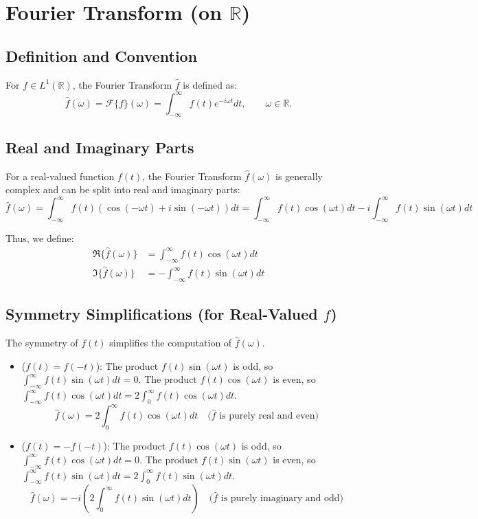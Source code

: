 \documentclass[12pt]{article}
\begin{document}
\section*{Fourier Transform (on $\mathbb{R}$)}

\subsection*{Definition and Convention}
For $f \in L^1(\mathbb{R})$, the Fourier Transform $\hat{f}$ is defined as:
\[
\hat{f}(\omega) = \mathcal{F}\{f\}(\omega) = \int_{-\infty}^{\infty} f(t) e^{-i\omega t} dt, \qquad \omega \in \mathbb{R}.
\]

\subsection*{Real and Imaginary Parts}
For a real-valued function $f(t)$, the Fourier Transform $\hat{f}(\omega)$ is generally complex and can be split into real and imaginary parts:
\[
\hat{f}(\omega) = \int_{-\infty}^{\infty} f(t) (\cos(-\omega t) + i \sin(-\omega t)) dt = \int_{-\infty}^{\infty} f(t) \cos(\omega t) dt - i \int_{-\infty}^{\infty} f(t) \sin(\omega t) dt
\]

\noindent
Thus, we define:
\begin{align*}
\Re\{\hat{f}(\omega)\} &= \int_{-\infty}^{\infty} f(t) \cos(\omega t) dt \\
\Im\{\hat{f}(\omega)\} &= -\int_{-\infty}^{\infty} f(t) \sin(\omega t) dt
\end{align*}

\subsection*{Symmetry Simplifications (for Real-Valued $f$)}
The symmetry of $f(t)$ simplifies the computation of $\hat{f}(\omega)$.

\begin{itemize}[leftmargin=*, label={$\bullet$}]
    \item ($f(t) = f(-t)$):
    The product $f(t)\sin(\omega t)$ is odd, so $\int_{-\infty}^{\infty} f(t) \sin(\omega t) dt = 0$.
    The product $f(t)\cos(\omega t)$ is even, so $\int_{-\infty}^{\infty} f(t) \cos(\omega t) dt = 2 \int_{0}^{\infty} f(t) \cos(\omega t) dt$.
    \[
    \hat{f}(\omega) = 2 \int_{0}^{\infty} f(t) \cos(\omega t) dt \quad \text{($\hat{f}$ is purely real and even)}
    \]

    \item ($f(t) = -f(-t)$):
    The product $f(t)\cos(\omega t)$ is odd, so $\int_{-\infty}^{\infty} f(t) \cos(\omega t) dt = 0$.
    The product $f(t)\sin(\omega t)$ is even, so $\int_{-\infty}^{\infty} f(t) \sin(\omega t) dt = 2 \int_{0}^{\infty} f(t) \sin(\omega t) dt$.
    \[
    \hat{f}(\omega) = -i \left( 2 \int_{0}^{\infty} f(t) \sin(\omega t) dt \right) \quad \text{($\hat{f}$ is purely imaginary and odd)}
    \]
\end{itemize}
\end{document}
